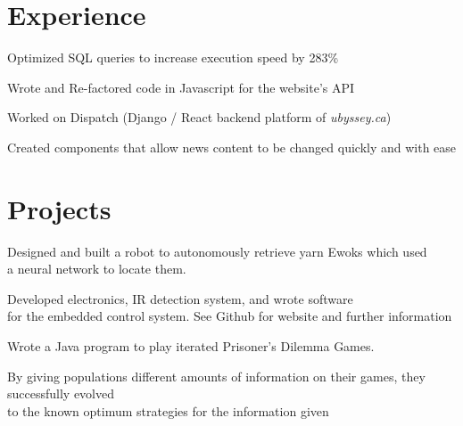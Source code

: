 \documentclass[]{deedy-resume-openfont}
\begin{document}

\section{Experience}

\begin{tightemize}
	\item Optimized SQL queries to increase execution speed by 283\%
	\item Wrote and Re-factored code in Javascript for the website’s API
\end{tightemize}
\sectionsep

\begin{tightemize}
	\item Worked on Dispatch (Django / React backend platform of \textit{ubyssey.ca})
	\item Created components that allow news content to be changed quickly and with ease
\end{tightemize}
\sectionsep

\section{Projects}

\begin{tightemize}
	\item Designed and built a robot to autonomously retrieve yarn Ewoks which used \\a neural network to locate them.
	\item Developed electronics, IR detection system, and wrote software \\for the embedded control system. See Github for website and further information
\end{tightemize}
\sectionsep

\begin{tightemize}
	\item Wrote a Java program to play iterated Prisoner's Dilemma Games.
	\item By giving populations different amounts of information on their games, they successfully evolved \\to the known optimum strategies for the information given
\end{tightemize}
\sectionsep
\end{document}
